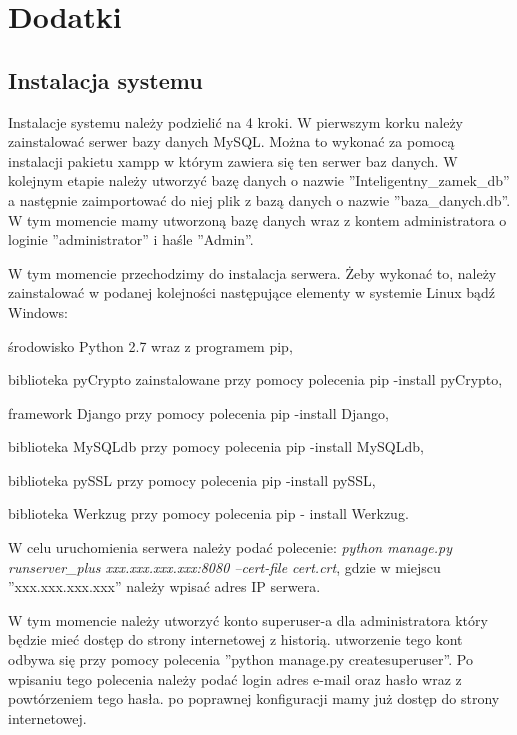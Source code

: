 \newpage
\section*{Dodatki} \label{Dodatki}
\subsection*{Instalacja systemu \NazwaSys}
Instalacje systemu należy podzielić na 4 kroki.
W pierwszym korku należy zainstalować serwer bazy danych MySQL. Można to wykonać za pomocą instalacji pakietu xampp w którym zawiera się ten serwer baz danych. W kolejnym etapie należy utworzyć bazę danych o nazwie ''Inteligentny\_zamek\_db'' a następnie zaimportować do niej plik z bazą danych o nazwie ''baza\_danych.db''. W tym momencie mamy utworzoną bazę danych wraz z kontem administratora o loginie ''administrator'' i haśle ''Admin''.  

 W tym momencie przechodzimy do instalacja serwera. Żeby wykonać to, należy zainstalować w podanej kolejności następujące elementy w systemie Linux bądź Windows:
\begin{itemize*}
	\item środowisko Python 2.7 wraz z programem pip,
	\item biblioteka pyCrypto zainstalowane przy pomocy polecenia pip -install pyCrypto,
	\item  framework Django przy pomocy polecenia pip -install Django,
	\item biblioteka MySQLdb przy pomocy polecenia pip -install MySQLdb,
	\item  biblioteka pySSL przy pomocy polecenia pip -install pySSL,
	\item biblioteka Werkzug przy pomocy polecenia pip - install Werkzug.
\end{itemize*}



W celu uruchomienia serwera należy podać polecenie:\newline
\textit{python manage.py runserver\_plus xxx.xxx.xxx.xxx:8080 --cert-file cert.crt}, \newline
gdzie w miejscu ''xxx.xxx.xxx.xxx'' należy wpisać adres IP serwera.

W tym momencie należy utworzyć konto superuser-a dla administratora który będzie mieć dostęp do strony internetowej z historią. utworzenie tego kont odbywa się przy pomocy polecenia ''python manage.py createsuperuser''. Po wpisaniu tego polecenia należy podać login adres e-mail oraz hasło wraz z powtórzeniem tego hasła. po poprawnej konfiguracji mamy już dostęp do strony internetowej.


